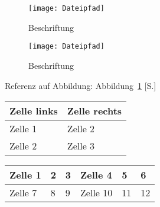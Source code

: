 %



\begin{figure}[!h]
	\texttt{[image: Dateipfad]}
	\caption{Beschriftung}
	\label{Bezeichnung für Verweis}
\end{figure}


\begin{figure}[!h]
	\begin{wide}	
		\texttt{[image: Dateipfad]}
		\begin{minipage}{0.66\textwidth}
			\caption{Beschriftung}
			\label{Bezeichnung}
		\end{minipage}
	\end{wide}
\end{figure}

Referenz auf Abbildung:
Abbildung~\ref{Bezeichnung für Verweis} [S.\pageref{Bezeichnung für Verweis}]


\begin{table}
	\begin{tabularx}{\textwidth}{|X|X|}
		\hline
		\bfseries Zelle links & \bfseries Zelle rechts \\ %
		\hline
		Zelle 1 & Zelle 2\\
		\hline
		Zelle 2 & Zelle 3\\
		\hline	
	\end{tabularx}
\end{table}

\begin{table}
	\begin{tabulary}{10.7cm}{|L|L|L|L|L|L|} %
		\hline
		Zelle 1 & 2	& 3 & Zelle 4 & 5 & 6\\
		\hline
		Zelle 7	& 8	& 9 & Zelle 10 & 11 & 12\\
		\hline
	\end{tabulary}
\end{table}

